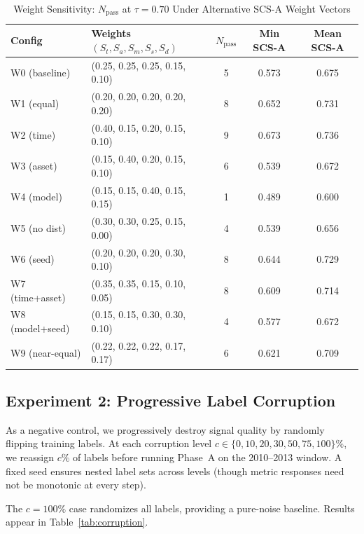 \documentclass[12pt,a4paper]{article}
\begin{document}
\begin{table}[H]
\centering
\caption{Weight Sensitivity: $N_{\text{pass}}$ at $\tau = 0.70$ Under Alternative SCS-A Weight Vectors}
\label{tab:weight_sensitivity}
\small
\begin{tabular}{llccc}
\toprule
Config & Weights $(S_t, S_a, S_m, S_s, S_d)$ & $N_{\text{pass}}$ & Min SCS-A & Mean SCS-A \\
\midrule
W0 (baseline) & (0.25, 0.25, 0.25, 0.15, 0.10) & 5 & 0.573 & 0.675 \\
W1 (equal)    & (0.20, 0.20, 0.20, 0.20, 0.20) & 8 & 0.652 & 0.731 \\
W2 (time)     & (0.40, 0.15, 0.20, 0.15, 0.10) & 9 & 0.673 & 0.736 \\
W3 (asset)    & (0.15, 0.40, 0.20, 0.15, 0.10) & 6 & 0.539 & 0.672 \\
W4 (model)    & (0.15, 0.15, 0.40, 0.15, 0.15) & 1 & 0.489 & 0.600 \\
W5 (no dist)  & (0.30, 0.30, 0.25, 0.15, 0.00) & 4 & 0.539 & 0.656 \\
W6 (seed)     & (0.20, 0.20, 0.20, 0.30, 0.10) & 8 & 0.644 & 0.729 \\
W7 (time+asset) & (0.35, 0.35, 0.15, 0.10, 0.05) & 8 & 0.609 & 0.714 \\
W8 (model+seed) & (0.15, 0.15, 0.30, 0.30, 0.10) & 4 & 0.577 & 0.672 \\
W9 (near-equal) & (0.22, 0.22, 0.22, 0.17, 0.17) & 6 & 0.621 & 0.709 \\
\bottomrule
\end{tabular}
\end{table}

\subsection{Experiment 2: Progressive Label Corruption}
\label{sec:corruption}

As a negative control, we progressively destroy signal quality by randomly flipping training labels. At each corruption level $c \in \{0, 10, 20, 30, 50, 75, 100\}\%$, we reassign $c\%$ of labels before running Phase~A on the 2010--2013 window. A fixed seed ensures nested label sets across levels (though metric responses need not be monotonic at every step).

The $c=100\%$ case randomizes all labels, providing a pure-noise baseline. Results appear in Table~\ref{tab:corruption}.
\end{document}
